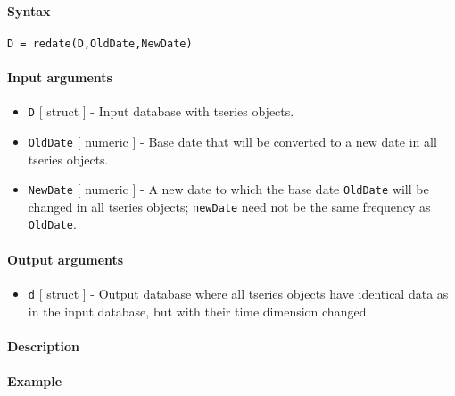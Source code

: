 


	\paragraph{Syntax}\label{syntax}

\begin{verbatim}
D = redate(D,OldDate,NewDate)
\end{verbatim}

\paragraph{Input arguments}\label{input-arguments}

\begin{itemize}
\item
  \texttt{D} {[} struct {]} - Input database with tseries objects.
\item
  \texttt{OldDate} {[} numeric {]} - Base date that will be converted to
  a new date in all tseries objects.
\item
  \texttt{NewDate} {[} numeric {]} - A new date to which the base date
  \texttt{OldDate} will be changed in all tseries objects;
  \texttt{newDate} need not be the same frequency as \texttt{OldDate}.
\end{itemize}

\paragraph{Output arguments}\label{output-arguments}

\begin{itemize}
\itemsep1pt\parskip0pt
\item
  \texttt{d} {[} struct {]} - Output database where all tseries objects
  have identical data as in the input database, but with their time
  dimension changed.
\end{itemize}

\paragraph{Description}\label{description}

\paragraph{Example}\label{example}



